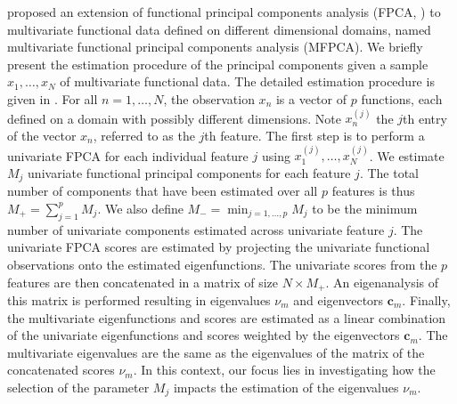 \cite{happMultivariateFunctionalPrincipal2018} proposed an extension of functional principal components analysis (FPCA, \cite{ramsayFunctionalDataAnalysis2005}) to multivariate functional data defined on different dimensional domains, named multivariate functional principal components analysis (MFPCA). We briefly present the estimation procedure of the principal components given a sample $x_1, \dots, x_N$ of multivariate functional data. The detailed estimation procedure is given in \cite[Section 3]{happMultivariateFunctionalPrincipal2018}. For all $n = 1, \dots, N$, the observation $x_n$ is a vector of $p$ functions, each defined on a domain with possibly different dimensions. Note $x_n^{(j)}$ the $j$th entry of the vector $x_n$, referred to as the $j$th feature. The first step is to perform a univariate FPCA for each individual feature $j$ using $x_1^{(j)}, \dots, x_N^{(j)}$. We estimate $M_j$ univariate functional principal components for each feature $j$. The total number of components that have been estimated over all $p$ features is thus $M_+ = \sum_{j = 1}^p M_j$. We also define $M_{-} = \min_{j = 1, \dots, p} M_j$ to be the minimum number of univariate components estimated across univariate feature $j$. The univariate FPCA scores are estimated by projecting the univariate functional observations onto the estimated eigenfunctions. The univariate scores from the $p$ features are then concatenated in a matrix of size $N \times M_+$. An eigenanalysis of this matrix is performed resulting in eigenvalues $\nu_m$ and eigenvectors $\mathbf{c}_m$. Finally, the multivariate eigenfunctions and scores are estimated as a linear combination of the univariate eigenfunctions and scores weighted by the eigenvectors $\mathbf{c}_m$. The multivariate eigenvalues are the same as the eigenvalues of the matrix of the concatenated scores $\nu_m$. In this context, our focus lies in investigating how the selection of the parameter $M_j$ impacts the estimation of the eigenvalues $\nu_m$.

